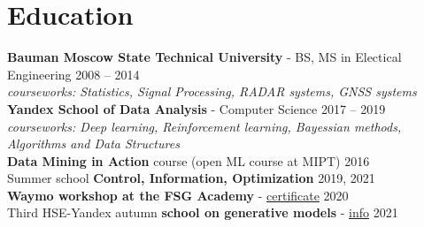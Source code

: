\section*{\sectionformat Education}
\textbf{Bauman Moscow State Technical University} - BS, MS in Electical Engineering \hfill 2008 -- 2014 \\
\textit{courseworks: Statistics, Signal Processing, RADAR systems, GNSS systems} \\
% 
\textbf{Yandex School of Data Analysis} - Computer Science \hfill 2017 -- 2019 \\
\textit{courseworks: Deep learning, Reinforcement learning, Bayessian methods, Algorithms and Data Structures} \\
% 
\textbf{Data Mining in Action} course (open ML course at MIPT) \hfill    2016         \\
% 
Summer school \textbf{Control, Information, Optimization}                                                                                             \hfill  2019, 2021 \\
%
\textbf{Waymo workshop at the FSG Academy} - \href{https://drive.google.com/file/d/1-WxECccxBrRWIvEt9WQeXKTueiF658r7/view?usp=sharing}{certificate}   \hfill  2020         \\
% 
Third HSE-Yandex autumn \textbf{school on generative models} - \href{https://indico.cern.ch/event/1082512/timetable/#20211123}{info}               \hfill  2021